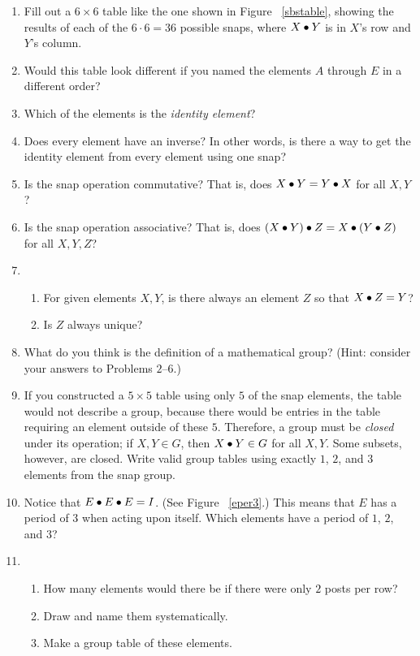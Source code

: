 \documentclass[../gatm.tex]{subfiles}
\begin{document}
\begin{enumerate}
\item Fill out a $6\times 6$ table like the one shown in Figure ~\ref{sbstable}, showing the results of each of the $6\cdot 6 = 36$ possible snaps, where $X\bullet Y$ is in $X$'s row and $Y$'s column.
\item Would this table look different if you named the elements $A$ through $E$ in a different order?
\item Which of the elements is the \textit{identity element}?
\item Does every element have an inverse? In other words, is there a way to get the identity element from every element using one snap?
\item Is the snap operation commutative? That is, does $X \bullet Y = Y \bullet X$ for all $X,Y$?
\item Is the snap operation associative? That is, does $(X \bullet Y) \bullet Z = X \bullet (Y\bullet Z)$ for all $X,Y,Z$?
\item \begin{enumerate}
\item For given elements $X, Y$, is there always an element $Z$ so that $X\bullet Z=Y$?
\item Is $Z$ always unique?
\end{enumerate}
\item What do you think is the definition of a mathematical group? (Hint: consider your answers to Problems $2$--$6$.)
\item If you constructed a $5\times 5$ table using only $5$ of the snap elements, the table would not describe a group, because there would be entries in the table requiring an element outside of these $5$. Therefore, a group must be \textit{closed} under its operation; if $X,Y\in G$, then $X\bullet Y\in G$ for all $X,Y$. Some subsets, however, are closed. Write valid group tables using exactly $1$, $2$, and $3$ elements from the snap group.
\item Notice that $E\bullet E\bullet E=I$. (See Figure ~\ref{eper3}.) This means that $E$ has a period of $3$ when acting upon itself. Which elements have a period of $1$, $2$, and $3$?
\item \begin{enumerate}
\item How many elements would there be if there were only $2$ posts per row?
\item Draw and name them systematically.
\item Make a group table of these elements.

\end{enumerate}
\end{enumerate}
\end{document}
